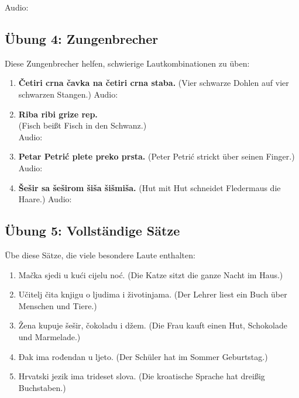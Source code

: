Audio: 

\subsection{Übung 4: Zungenbrecher}

Diese Zungenbrecher helfen, schwierige Lautkombinationen zu üben:

\begin{enumerate}
    \item \textbf{Četiri crna čavka na četiri crna staba.}
    (Vier schwarze Dohlen auf vier schwarzen Stangen.)
    Audio: 
    
    \item \textbf{Riba ribi grize rep.}\\
    (Fisch beißt Fisch in den Schwanz.)\\
    Audio: 
    
    \item \textbf{Petar Petrić plete preko prsta.}
    (Peter Petrić strickt über seinen Finger.)
    Audio: 
    
    \item \textbf{Šešir sa šeširom šiša šišmiša.}
    (Hut mit Hut schneidet Fledermaus die Haare.)
    Audio: 
\end{enumerate}

\subsection{Übung 5: Vollständige Sätze}

Übe diese Sätze, die viele besondere Laute enthalten:

\begin{enumerate}
    \item Mačka sjedi u kući cijelu noć.
    (Die Katze sitzt die ganze Nacht im Haus.)
    
    \item Učitelj čita knjigu o ljudima i životinjama.
    (Der Lehrer liest ein Buch über Menschen und Tiere.)
    
    \item Žena kupuje šešir, čokoladu i džem.
    (Die Frau kauft einen Hut, Schokolade und Marmelade.)
    
    \item Đak ima rođendan u ljeto.
    (Der Schüler hat im Sommer Geburtstag.)
    
    \item Hrvatski jezik ima trideset slova.
    (Die kroatische Sprache hat dreißig Buchstaben.)
\end{enumerate}

